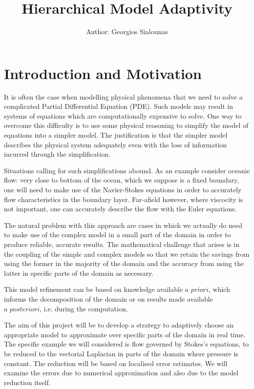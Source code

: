 \documentclass[12pt,a4paper]{article}
\title{Hierarchical Model Adaptivity}
\author{Author: Georgios Sialounas}
\theoremstyle{definition}
\begin{document}
\maketitle
\thispagestyle{empty}
\newpage
\tableofcontents
\thispagestyle{empty}
\newpage
\setcounter{page}{1}


\section{Introduction and Motivation}

It is often the case when modelling physical phenomena that we need to solve a complicated Partial Differential Equation (PDE).  Such models may result in systems of equations which are computationally expensive to solve.  One way to overcome this difficulty is to use some physical reasoning to simplify the model of equations into a simpler model.  The justification is that the simpler model describes the physical system adequately even with the loss of information incurred through the simplification.  

Situations calling for such simplifications abound.  As an example consider oceanic flow: very close to bottom of the ocean, which we suppose is a fixed boundary, one will need to make use of the Navier-Stokes equations in order to accurately flow characteristics in the boundary layer.  Far-afield however, where viscocity is not important, one can accurately describe the flow with the Euler equations.  

The natural problem with this approach are cases in which we actually do need to make use of the complex model in a small part of the domain in order to produce reliable, accurate results.   The mathematical challenge that arises is in the coupling of the simple and complex models so that we retain the savings from using the former in the majority of the domain and the accuracy from using the latter in specific parts of the domain as necessary.

This model refinement can be based on knowledge available $\textit{a priori}$, which informs the decomposition of the domain or on results made available $\textit{a posteriori}$, i.e. during the computation.

The aim of this project will be to develop a strategy to adaptively choose an appropriate model to approximate over specific parts of the domain in real time.  The specific example we will considered is flow governed by Stokes's equations, to be reduced to the vectorial Laplacian in parts of the domain where pressure is constant.  The reduction will be based on localised error estimates.  We will examine the errors due to numerical approximation and also due to the model reduction itself.
\end{document}

